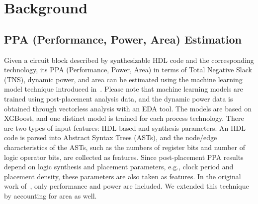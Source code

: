 \section{Background}
\label{sec:background}

\subsection{PPA (Performance, Power, Area) Estimation}
\label{sec:ppa_models}


Given a circuit block described by synthesizable HDL code and the corresponding technology, its PPA (Performance, Power, Area) in terms of Total Negative Slack (TNS), dynamic power, and area can be estimated using the machine learning model technique introduced in~\cite{sengupta2022ppa}. Please note that machine learning models are trained using post-placement analysis data, and the dynamic power data is obtained through vectorless analysis with an EDA tool. The models are based on XGBoost, and one distinct model is trained for each process technology. There are two types of input features: HDL-based and synthesis parameters. An HDL code is parsed into Abstract Syntax Trees (ASTs), and the node/edge characteristics of the ASTs, such as the numbers of register bits and number of logic operator bits, are collected as features. Since post-placement PPA results depend on logic synthesis and placement parameters, e.g., clock period and placement density, these parameters are also taken as features. In the original work of~\cite{sengupta2022ppa}, only performance and power are included. We extended this technique by accounting for area as well.    


